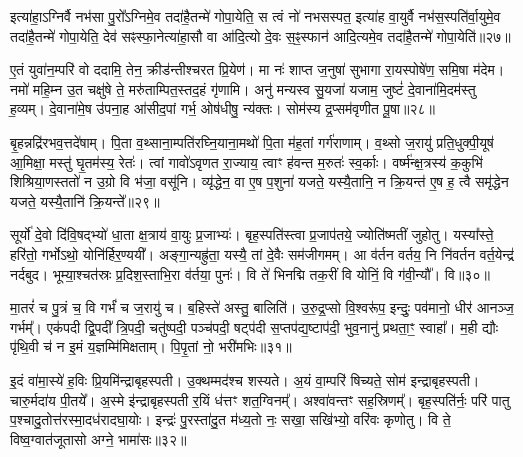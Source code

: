 इत्या॑हा॒\-ऽग्निर्वै नभ॑सा पु॒रो᳚\-ऽग्निमे॒व तदा॑है॒तन्मे॑ गोपा॒येति॒ स त्वं नो॑ नभसस्पत॒ इत्या॑ह वा॒युर्वै नभ॑स॒स्पति॑र्वा॒युमे॒व तदा॑है॒तन्मे॑ गोपा॒येति॒ देव॑ सꣴस्फा॒नेत्या॑हा॒सौ वा आ॑दि॒त्यो दे॒वः स॒ꣴ॒स्फान॑ आदि॒त्यमे॒व तदा॑है॒तन्मे॑ गोपा॒येति॑॥२७॥

{\anuvakamend[{कुसी॑द॒न्त्वन्न॑ एनमोषे॒द्यदि॑ पु॒र आ॑दि॒त्यमे॒व तदा॑है॒तन्मे॑ गोपा॒येति॑॥८॥}]}

ए॒तं युवा॑न॒म्परि॑ वो ददामि॒ तेन॒ क्रीड॑न्तीश्चरत प्रि॒येण॑। मा नः॑ शाप्त ज॒नुषा॑ सुभागा रा॒यस्पोषे॑ण॒ समि॒षा म॑देम। नमो॑ महि॒म्न उ॒त चक्षु॑षे ते॒ मरु॑ताम्पित॒स्तद॒हं गृ॑णामि। अनु॑ मन्यस्व सु॒यजा॑ यजाम॒ जुष्टं॑ दे॒वाना॑मि॒दम॑स्तु ह॒व्यम्। दे॒वाना॑मे॒ष उ॑पना॒ह आ॑सीद॒पां गर्भ॒ ओष॑धीषु॒ न्य॑क्तः। सोम॑स्य द्र॒प्सम॑वृणीत पू॒षा॥२८॥

बृ॒हन्नद्रि॑रभव॒त्तदे॑षाम्। पि॒ता व॒थ्साना॒म्पति॑रघ्नि॒याना॒मथो॑ पि॒ता म॑ह॒तां गर्ग॑राणाम्। व॒थ्सो ज॒रायु॑ प्रति॒धुक्पी॒यूष॑ आ॒मिक्षा॒ मस्तु॑ घृ॒तम॑स्य॒ रेतः॑। त्वां गावो॑\-ऽवृणत रा॒ज्याय॒ त्वाꣳ ह॑वन्त म॒रुतः॑ स्व॒र्काः। वर्ष्म॑न्क्ष॒त्रस्य॑ क॒कुभि॑ शिश्रिया॒णस्ततो॑ न उ॒ग्रो वि भ॑जा॒ वसू॑नि। व्यृ॑द्धेन॒ वा ए॒ष प॒शुना॑ यजते॒ यस्यै॒तानि॒ न क्रि॒यन्त॑ ए॒ष ह॒ त्वै समृ॑द्धेन यजते॒ यस्यै॒तानि॑ क्रि॒यन्ते᳚॥२९॥

{\anuvakamend[{पू॒षा क्रि॒यन्त॑ ए॒षो᳚\-ऽष्टौ च॑॥९॥}]}

सूर्यो॑ दे॒वो दि॑वि॒षद्भ्यो॑ धा॒ता क्ष॒त्राय॑ वा॒युः प्र॒जाभ्यः॑। बृह॒स्पति॑स्त्वा प्र॒जाप॑तये॒ ज्योति॑ष्मतीं जुहोतु। यस्या᳚स्ते॒ हरि॑तो॒ गर्भो\-ऽथो॒ योनि॑र्\mbox{}हिर॒ण्ययी᳚। अङ्गा॒न्यह्रु॑ता॒ यस्यै॒ तां दे॒वैः सम॑जीगमम्। आ व॑र्तन वर्तय॒ नि नि॑वर्तन वर्त॒येन्द्र॑ नर्दबुद। भूम्या॒श्चत॑स्रः प्र॒दिश॒स्ताभि॒रा व॑र्तया॒ पुनः॑। वि ते॑ भिनद्मि तक॒रीं वि योनिं॒ वि ग॑वी॒न्यौ᳚। वि॥३०॥

मा॒तरं॑ च पु॒त्रं च॒ वि गर्भं॑ च ज॒रायु॑ च। ब॒हिस्ते॑ अस्तु॒ बालिति॑। उ॒रु॒द्र॒प्सो वि॒श्वरू॑प॒ इन्दुः॒ पव॑मानो॒ धीर॑ आनञ्ज॒ गर्भम्᳚। एक॑पदी द्वि॒पदी᳚ त्रि॒पदी॒ चतु॑ष्पदी॒ पञ्च॑पदी॒ षट्प॑दी स॒प्तप॑द्य॒ष्टाप॑दी॒ भुव॒नानु॑ प्रथता॒ꣳ॒ स्वाहा᳚। म॒ही द्यौः पृ॑थि॒वी च॑ न इ॒मं य॒ज्ञम्मि॑मिक्षताम्। पि॒पृ॒तां नो॒ भरी॑मभिः॥३१॥

{\anuvakamend[{ग॒वी॒न्यौ॑ वि चतु॑श्चत्वारिꣳशच्च॥10॥}]}

इ॒दं वा॑मा॒स्ये॑ ह॒विः प्रि॒यमि॑न्द्राबृहस्पती। उ॒क्थम्मद॑श्च शस्यते। अ॒यं वा॒म्परि॑ षिच्यते॒ सोम॑ इन्द्राबृहस्पती। चारु॒र्मदा॑य पी॒तये᳚। अ॒स्मे इ॑न्द्राबृहस्पती र॒यिं ध॑त्तꣳ शत॒ग्विनम्᳚। अश्वा॑वन्तꣳ सह॒स्रिणम्᳚। बृह॒स्पति॑र्नः॒ परि॑ पातु प॒श्चादु॒तोत्त॑रस्मा॒दध॑रादघा॒योः। इन्द्रः॑ पु॒रस्ता॑दु॒त म॑ध्य॒तो नः॒ सखा॒ सखि॑भ्यो॒ वरि॑वः कृणोतु। वि ते॒ विष्व॒ग्वात॑जूतासो अग्ने॒ भामा॑सः॥३२॥


